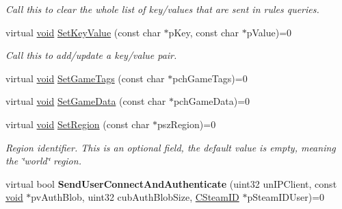 \begin{DoxyCompactItemize}
\begin{DoxyCompactList}\small\item\em Call this to clear the whole list of key/values that are sent in rules queries. \end{DoxyCompactList}\item 
\hypertarget{classISteamGameServer_a69a8b52ed6637094322c3479c335c94a}{}virtual \hyperlink{SDL__audio_8h_a52835ae37c4bb905b903cbaf5d04b05f}{void} \hyperlink{classISteamGameServer_a69a8b52ed6637094322c3479c335c94a}{Set\+Key\+Value} (const char $\ast$p\+Key, const char $\ast$p\+Value)=0\label{classISteamGameServer_a69a8b52ed6637094322c3479c335c94a}

\begin{DoxyCompactList}\small\item\em Call this to add/update a key/value pair. \end{DoxyCompactList}\item 
virtual \hyperlink{SDL__audio_8h_a52835ae37c4bb905b903cbaf5d04b05f}{void} \hyperlink{classISteamGameServer_a2e12f2c66ae3f42bdc23a6e2a3f65697}{Set\+Game\+Tags} (const char $\ast$pch\+Game\+Tags)=0
\item 
virtual \hyperlink{SDL__audio_8h_a52835ae37c4bb905b903cbaf5d04b05f}{void} \hyperlink{classISteamGameServer_ac49da636dd3719648ddf39e882fa9639}{Set\+Game\+Data} (const char $\ast$pch\+Game\+Data)=0
\item 
\hypertarget{classISteamGameServer_aa4643622be52a83bc970a1804d92b9d6}{}virtual \hyperlink{SDL__audio_8h_a52835ae37c4bb905b903cbaf5d04b05f}{void} \hyperlink{classISteamGameServer_aa4643622be52a83bc970a1804d92b9d6}{Set\+Region} (const char $\ast$psz\+Region)=0\label{classISteamGameServer_aa4643622be52a83bc970a1804d92b9d6}

\begin{DoxyCompactList}\small\item\em Region identifier. This is an optional field, the default value is empty, meaning the \char`\"{}world\char`\"{} region. \end{DoxyCompactList}\item 
\hypertarget{classISteamGameServer_a7b00dd07661cbf8706e5967a31091c5b}{}virtual bool {\bfseries Send\+User\+Connect\+And\+Authenticate} (uint32 un\+I\+P\+Client, const \hyperlink{SDL__audio_8h_a52835ae37c4bb905b903cbaf5d04b05f}{void} $\ast$pv\+Auth\+Blob, uint32 cub\+Auth\+Blob\+Size, \hyperlink{classCSteamID}{C\+Steam\+I\+D} $\ast$p\+Steam\+I\+D\+User)=0\label{classISteamGameServer_a7b00dd07661cbf8706e5967a31091c5b}


\end{DoxyCompactItemize}
